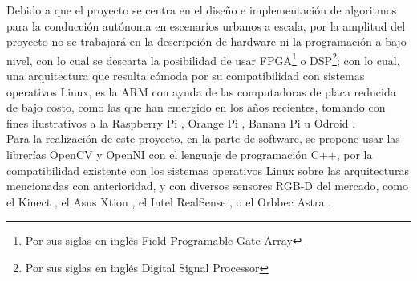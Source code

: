 \par Debido a que el proyecto se centra en el diseño e implementación de algoritmos para la conducción autónoma en escenarios urbanos a escala, por la amplitud del proyecto no se trabajará en la descripción de hardware ni la programación a bajo nivel, con lo cual se descarta la posibilidad de usar FPGA\footnote{Por sus siglas en inglés Field-Programable Gate Array} o DSP\footnote{Por sus siglas en inglés Digital Signal Processor}; con lo cual, una arquitectura que resulta cómoda por su compatibilidad con sistemas operativos Linux, es la ARM con ayuda de las computadoras de placa reducida de bajo costo, como las que han emergido en los años recientes, tomando con fines ilustrativos a la Raspberry Pi \cite{foundationRaspberryPiTeach}, Orange Pi \cite{OrangePiOrangepi}, Banana Pi \cite{BananaPiBPI} u Odroid \cite{ODROID}.\\
Para la realización de este proyecto, en la parte de software, se propone usar las librerías OpenCV \cite{opencvOpenCVReferenceManual} y OpenNI \cite{openniOpenNIProgrammerGuide} con el lenguaje de programación C++, por la compatibilidad existente con los sistemas operativos Linux sobre las arquitecturas mencionadas con anterioridad, y con diversos sensores RGB-D del mercado, como el Kinect \cite{InformacionSensorKinect}, el Asus Xtion \cite{XtionPROLIVE}, el Intel RealSense \cite{TecnologiaIntelRealSense}, o el Orbbec Astra \cite{gordonAstraSeries}. 